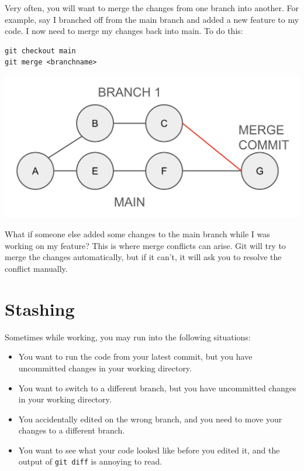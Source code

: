 \documentclass[fleqn]{article}
\begin{document}
Very often, you will want to merge the changes from one branch into another. 
For example, say I branched off from the main branch and added a new feature 
to my code. I now need to merge my changes back into main. To do this:

\begin{lstlisting}
git checkout main
git merge <branchname>
\end{lstlisting}

\begin{center}
    \includegraphics[scale=0.3]{figs/merge.png}
\end{center}

What if someone else added some changes to the main branch while I was working
on my feature? This is where merge conflicts can arise. Git will try to merge
the changes automatically, but if it can't, it will ask you to resolve the
conflict manually.

\pagebreak

\section*{Stashing}

Sometimes while working, you may run into the following situations:
\begin{itemize}
    \item You want to run the code from your latest commit, but you have
          uncommitted changes in your working directory.
    \item You want to switch to a different branch, but you have uncommitted
          changes in your working directory.
    \item You accidentally edited on the wrong branch, and you need to move your
          changes to a different branch.
    \item You want to see what your code looked like before you edited it, and
          the output of \texttt{git diff} is annoying to read.
\end{itemize}
\end{document}
